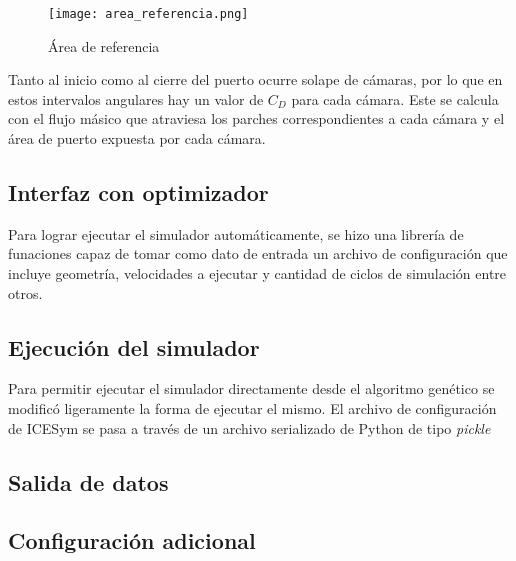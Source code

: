 \begin{figure}
    \centering
    \texttt{[image: area\_referencia.png]}
    \caption{Área de referencia}\label{fig:area_referencia}
\end{figure}

Tanto al inicio como al cierre del puerto ocurre solape de cámaras, por lo que
en estos intervalos angulares hay un valor de $C_D$ para cada cámara.
%
Este se calcula con el flujo másico que atraviesa los parches correspondientes
a cada cámara y el área de puerto expuesta por cada cámara.

\subsection{Interfaz con optimizador}
%
Para lograr ejecutar el simulador automáticamente, se hizo una librería de
funaciones capaz de tomar como dato de entrada un archivo de configuración que
incluye geometría, velocidades a ejecutar y cantidad de ciclos de simulación
entre otros.
%



\subsection{Ejecución del simulador}
%
Para permitir ejecutar el simulador directamente desde el algoritmo genético
se modificó ligeramente la forma de ejecutar el mismo.
%
El archivo de configuración de ICESym se pasa a través de un archivo
serializado de Python de tipo \emph{pickle}

\subsection{Salida de datos}
\subsection{Configuración adicional}

